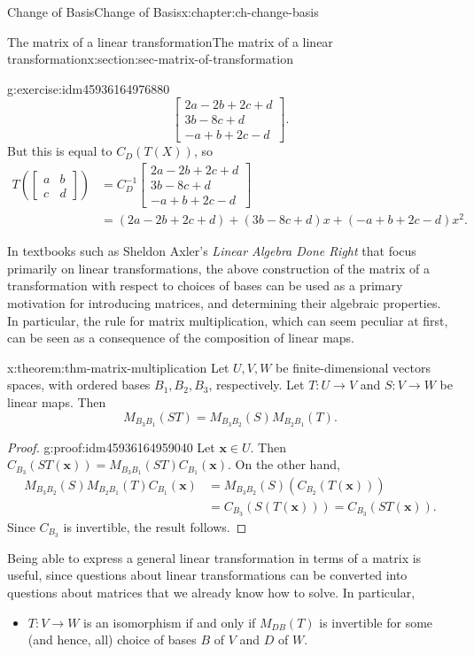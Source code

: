 \documentclass[oneside,10pt,]{book}
\numberwithin{equation}{section}
\newcommand{\bbm}{\begin{bmatrix}}
\newcommand{\ebm}{\end{bmatrix}}
\newcommand{\xx}{\mathbf{x}}
\newcommand{\amp}{&}
\begin{document}
\begin{chapterptx}{Change of Basis}{}{Change of Basis}{}{}{x:chapter:ch-change-basis}
\begin{sectionptx}{The matrix of a linear transformation}{}{The matrix of a linear transformation}{}{}{x:section:sec-matrix-of-transformation}
\begin{inlineexercise}{}{g:exercise:idm45936164976880}
\begin{equation*}
\bbm 2a-2b+2c+d\\3b-8c+d\\-a+b+2c-d\ebm\text{.}
\end{equation*}
But this is equal to \(C_D(T(X))\), so%
\begin{align*}
T\left(\bbm a\amp b\\c\amp d\ebm\right) \amp = C_D^{-1}\bbm 2a-2b+2c+d\\3b-8c+d\\-a+b+2c-d\ebm\\
\amp = (2a-2b+2c+d)+(3b-8c+d)x+(-a+b+2c-d)x^2\text{.}
\end{align*}
%
\end{inlineexercise}%
In textbooks such as Sheldon Axler's \emph{Linear Algebra Done Right} that focus primarily on linear transformations, the above construction of the matrix of a transformation with respect to choices of bases can be used as a primary motivation for introducing matrices, and determining their algebraic properties. In particular, the rule for matrix multiplication, which can seem peculiar at first, can be seen as a consequence of the composition of linear maps.%
\begin{theorem}{}{}{x:theorem:thm-matrix-multiplication}%
Let \(U,V,W\) be finite-dimensional vectors spaces, with ordered bases \(B_1,B_2,B_3\), respectively. Let \(T:U\to V\) and \(S:V\to W\) be linear maps. Then%
\begin{equation*}
M_{B_3B_1}(ST) = M_{B_3B_2}(S)M_{B_2B_1}(T)\text{.}
\end{equation*}
%
\end{theorem}
\begin{proof}{}{g:proof:idm45936164959040}
Let \(\xx\in U\). Then \(C_{B_3}(ST(\xx)) = M_{B_3B_1}(ST)C_{B_1}(\xx)\). On the other hand,%
\begin{align*}
M_{B_3B_2}(S)M_{B_2B_1}(T)C_{B_1}(\xx) \amp  = M_{B_3B_2}(S)(C_{B_2}(T(\xx)))\\
\amp = C_{B_3}(S(T(\xx))) = C_{B_3}(ST(\xx))\text{.}
\end{align*}
Since \(C_{B_3}\) is invertible, the result follows.%
\end{proof}
Being able to express a general linear transformation in terms of a matrix is useful, since questions about linear transformations can be converted into questions about matrices that we already know how to solve. In particular,%
\begin{itemize}[label=\textbullet]
\item{}\(T:V\to W\) is an isomorphism if and only if \(M_{DB}(T)\) is invertible for some (and hence, all) choice of bases \(B\) of \(V\) and \(D\) of \(W\).%

\end{itemize}
\end{sectionptx}
\end{chapterptx}
\end{document}
